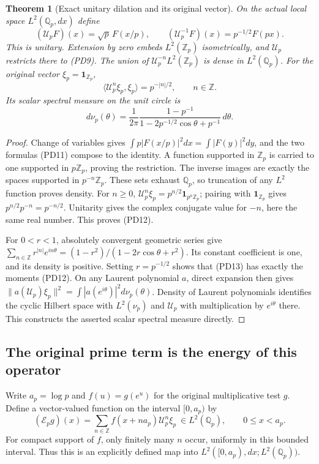 \documentclass[11pt,a4paper]{article}
\newtheorem{theorem}{Theorem}[section]
\theoremstyle{definition}\newtheorem{definition}[theorem]{Definition}
\newcommand{\Z}{\mathbb Z}\newcommand{\Q}{\mathbb Q}
\begin{document}
\begin{theorem}[Exact unitary dilation and its original vector]
\label{thm:PD-dilation}
On the actual local space $L^2(\Q_p,dx)$ define
\[
 (\mathscr U_pF)(x)=\sqrt p\,F(x/p),\qquad
 (\mathscr U_p^{-1}F)(x)=p^{-1/2}F(px).
 \tag{PD11}
\]
This is unitary. Extension by zero embeds $L^2(\Z_p)$ isometrically,
and $\mathscr U_p$ restricts there to (PD9). The union of
$\mathscr U_p^{-n}L^2(\Z_p)$ is dense in $L^2(\Q_p)$.
For the original vector $\xi_p=\mathbf1_{\Z_p}$,
\[
 \langle \mathscr U_p^n\xi_p,\xi_p\rangle=p^{-|n|/2},\qquad n\in\Z.
 \tag{PD12}\label{eq:PD-moments}
\]
Its scalar spectral measure on the unit circle is
\[
 d\nu_p(\theta)=\frac1{2\pi}
 \frac{1-p^{-1}}{1-2p^{-1/2}\cos\theta+p^{-1}}\,d\theta.
 \tag{PD13}\label{eq:PD-measure}
\]
\end{theorem}
\begin{proof}
Change of variables gives
$\int p|F(x/p)|^2dx=\int|F(y)|^2dy$, and the two formulas (PD11)
compose to the identity. A function supported in $\Z_p$ is carried
to one supported in $p\Z_p$, proving the restriction. The inverse
images are exactly the spaces supported in $p^{-n}\Z_p$. These sets
exhaust $\Q_p$, so truncation of any $L^2$ function proves density.
For $n\ge0$,
$\mathscr U_p^n\xi_p=p^{n/2}\mathbf1_{p^n\Z_p}$; pairing with
$\mathbf1_{\Z_p}$ gives $p^{n/2}p^{-n}=p^{-n/2}$.
Unitarity gives the complex conjugate value for $-n$, here the same real
number. This proves (PD12).

For $0<r<1$, absolutely convergent geometric series give
$\sum_{n\in\Z}r^{|n|}e^{in\theta}
=(1-r^2)/(1-2r\cos\theta+r^2)$. Its constant coefficient is one,
and its density is positive. Setting $r=p^{-1/2}$ shows that (PD13)
has exactly the moments (PD12). On any Laurent polynomial $a$, direct
expansion then gives
$\|a(\mathscr U_p)\xi_p\|^2=\int|a(e^{i\theta})|^2d\nu_p(\theta)$.
Density of Laurent polynomials identifies the cyclic Hilbert space with
$L^2(\nu_p)$ and $\mathscr U_p$ with multiplication by $e^{i\theta}$ there.
This constructs the asserted scalar spectral measure directly.
\end{proof}

\subsection{The original prime term is the energy of this operator}
Write $a_p=\log p$ and
$f(u)=g(e^u)$ for the original multiplicative test $g$.
Define a vector-valued function on the interval $[0,a_p)$ by
\[
 (\mathcal E_pg)(x)=
 \sum_{n\in\Z} f(x+n a_p)\mathscr U_p^n\xi_p
 \ \in L^2(\Q_p),\qquad 0\le x<a_p.
 \tag{PD14}\label{eq:PD-energy-map}
\]
For compact support of $f$, only finitely many $n$ occur, uniformly in
this bounded interval. Thus this is an explicitly defined map into
$L^2([0,a_p),dx;L^2(\Q_p))$.
\end{document}
